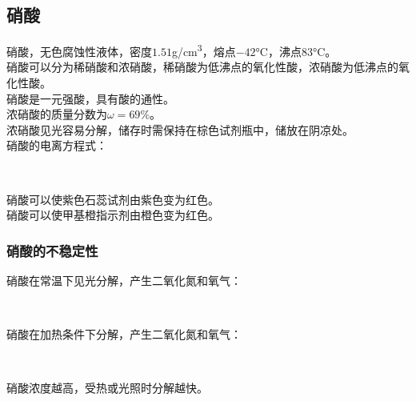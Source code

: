 \documentclass[UTF8]{ctexart}
\begin{document}
\subsection{硝酸}
    硝酸，无色腐蚀性液体，密度$1.51$\si{g/cm^3}，熔点$-42$\si{\degreeCelsius}，沸点$83$\si{\degreeCelsius}。\\[3mm]
    硝酸可以分为稀硝酸和浓硝酸，稀硝酸为低沸点的氧化性酸，浓硝酸为低沸点的氧化性酸。\\[3mm]
    硝酸是一元强酸，具有酸的通性。\\[6mm]
    浓硝酸的质量分数为$\omega=69\%$。\\[3mm]
    浓硝酸见光容易分解，储存时需保持在棕色试剂瓶中，储放在阴凉处。\\[6mm]
    硝酸的电离方程式：
    \begin{center}
        \\[6mm]
    \end{center}
    硝酸可以使紫色石蕊试剂由紫色变为红色。\\[3mm]
    硝酸可以使甲基橙指示剂由橙色变为红色。

\subsubsection{硝酸的不稳定性}
    硝酸在常温下见光分解，产生二氧化氮和氧气：
    \begin{center}
        \\[6mm]
    \end{center}
    硝酸在加热条件下分解，产生二氧化氮和氧气：
    \begin{center}
        \\[6mm]
    \end{center}
    硝酸浓度越高，受热或光照时分解越快。

\newpage
\end{document}
